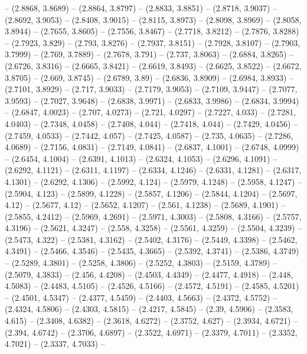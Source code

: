 {  -- (2.8868, 3.8689) -- (2.8864, 3.8797) -- (2.8833, 3.8851) -- (2.8718, 
  3.9037) -- (2.8692, 3.9053) -- (2.8408, 3.9015) -- (2.8115, 3.8973) -- 
  (2.8098, 3.8969) -- (2.8058, 3.8944) -- (2.7655, 3.8605) -- (2.7556, 3.8467) 
  -- (2.7718, 3.8212) -- (2.7876, 3.8288) -- (2.7923, 3.829) -- (2.793, 3.8276) 
  -- (2.7937, 3.8151) -- (2.7928, 3.8107) -- (2.7903, 3.7999) -- (2.769, 3.7889)
   -- (2.7678, 3.791) -- (2.737, 3.8063) -- (2.6884, 3.8265) -- (2.6726, 3.8316)
   -- (2.6665, 3.8421) -- (2.6619, 3.8493) -- (2.6625, 3.8522) -- (2.6672, 
  3.8705) -- (2.669, 3.8745) -- (2.6789, 3.89) -- (2.6836, 3.8909) -- (2.6984, 
  3.8933) -- (2.7101, 3.8929) -- (2.717, 3.9033) -- (2.7179, 3.9053) -- (2.7109,
   3.9447) -- (2.7077, 3.9593) -- (2.7027, 3.9648) -- (2.6838, 3.9971) -- 
  (2.6833, 3.9986) -- (2.6834, 3.9994) -- (2.6847, 4.0023) -- (2.707, 4.0273) --
   (2.721, 4.0297) -- (2.7227, 4.033) -- (2.7281, 4.0403) -- (2.7348, 4.0458) --
   (2.7408, 4.044) -- (2.7418, 4.044) -- (2.7429, 4.0456) -- (2.7459, 4.0533) --
   (2.7442, 4.057) -- (2.7425, 4.0587) -- (2.735, 4.0635) -- (2.7286, 4.0689) --
   (2.7156, 4.0831) -- (2.7149, 4.0841) -- (2.6837, 4.1001) -- (2.6748, 4.0999) 
  -- (2.6454, 4.1004) -- (2.6391, 4.1013) -- (2.6324, 4.1053) -- (2.6296, 
  4.1091) -- (2.6292, 4.1121) -- (2.6311, 4.1197) -- (2.6334, 4.1246) -- 
  (2.6331, 4.1281) -- (2.6317, 4.1301) -- (2.6292, 4.1306) -- (2.5992, 4.124) --
   (2.5979, 4.1248) -- (2.5958, 4.1247) -- (2.5904, 4.123) -- (2.5899, 4.1228) 
  -- (2.5857, 4.1206) -- (2.5844, 4.1204) -- (2.5697, 4.12) -- (2.5677, 4.12) --
   (2.5652, 4.1207) -- (2.561, 4.1238) -- (2.5689, 4.1901) -- (2.5855, 4.2412) 
  -- (2.5969, 4.2691) -- (2.5971, 4.3003) -- (2.5808, 4.3166) -- (2.5757, 
  4.3196) -- (2.5621, 4.3247) -- (2.558, 4.3258) -- (2.5561, 4.3259) -- (2.5504,
   4.3239) -- (2.5473, 4.322) -- (2.5381, 4.3162) -- (2.5402, 4.3176) -- 
  (2.5449, 4.3398) -- (2.5462, 4.3491) -- (2.5466, 4.3546) -- (2.5435, 4.3665) 
  -- (2.5392, 4.3741) -- (2.5386, 4.3749) -- (2.5289, 4.3801) -- (2.5258, 
  4.3806) -- (2.5252, 4.3803) -- (2.5159, 4.3789) -- (2.5079, 4.3833) -- (2.456,
   4.4208) -- (2.4503, 4.4349) -- (2.4477, 4.4918) -- (2.448, 4.5083) -- 
  (2.4483, 4.5105) -- (2.4526, 4.5166) -- (2.4572, 4.5191) -- (2.4585, 4.5201) 
  -- (2.4501, 4.5347) -- (2.4377, 4.5459) -- (2.4403, 4.5663) -- (2.4372, 
  4.5752) -- (2.4324, 4.5806) -- (2.4303, 4.5815) -- (2.4217, 4.5845) -- (2.39, 
  4.5906) -- (2.3583, 4.615) -- (2.3408, 4.6382) -- (2.3618, 4.6272) -- (2.3752,
   4.627) -- (2.3934, 4.6721) -- (2.394, 4.6742) -- (2.3706, 4.6897) -- (2.3522,
   4.6971) -- (2.3379, 4.7011) -- (2.3352, 4.7021) -- (2.3337, 4.7033) -- 
}
